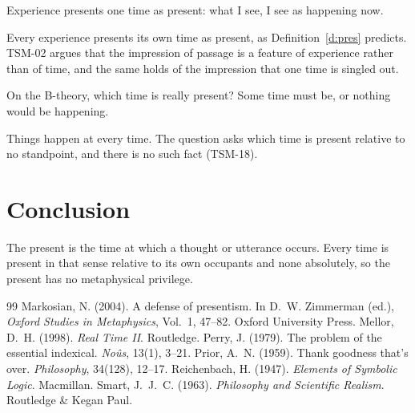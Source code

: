 \documentclass{situationist-preprint}
\begin{document}
\begin{objection}[Experience]\label{o:exp}
Experience presents one time as present: what I see, I see as happening now.
\end{objection}

\begin{reply}
Every experience presents its own time as present, as Definition~\ref{d:pres} predicts. TSM-02 argues that the impression of passage is a feature of experience rather than of time, and the same holds of the impression that one time is singled out.
\end{reply}

\begin{objection}\label{o:which}
On the B-theory, which time is really present? Some time must be, or nothing would be happening.
\end{objection}

\begin{reply}
Things happen at every time. The question asks which time is present relative to no standpoint, and there is no such fact (TSM-18).
\end{reply}

\section{Conclusion}

The present is the time at which a thought or utterance occurs. Every time is present in that sense relative to its own occupants and none absolutely, so the present has no metaphysical privilege.

\begin{thebibliography}{99}\small
{} Markosian, N. (2004). A defense of presentism. In D.~W. Zimmerman (ed.), \emph{Oxford Studies in Metaphysics}, Vol.~1, 47--82. Oxford University Press.
 Mellor, D.~H. (1998). \emph{Real Time II}. Routledge.
 Perry, J. (1979). The problem of the essential indexical. \emph{No{\^u}s}, 13(1), 3--21.
 Prior, A.~N. (1959). Thank goodness that's over. \emph{Philosophy}, 34(128), 12--17.
 Reichenbach, H. (1947). \emph{Elements of Symbolic Logic}. Macmillan.
 Smart, J.~J.~C. (1963). \emph{Philosophy and Scientific Realism}. Routledge \& Kegan Paul.
\end{thebibliography}
\end{document}
